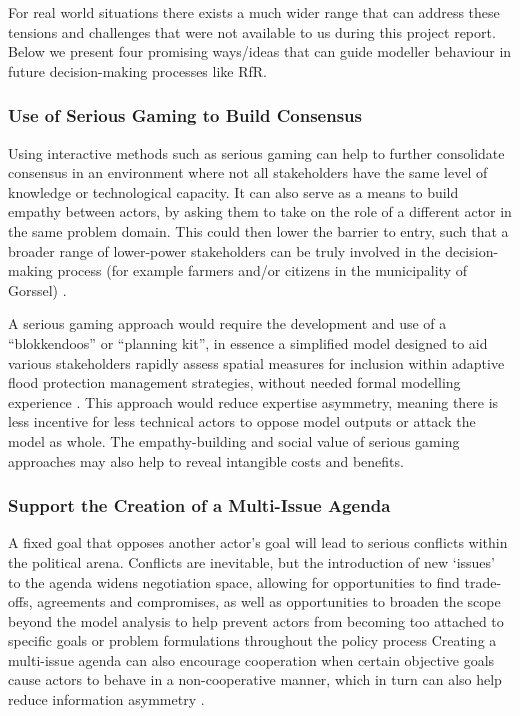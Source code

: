 For real world situations there exists a much wider range that can address these tensions and challenges that were not available to us during this project report. Below we present four promising ways/ideas that can guide modeller behaviour in future decision-making processes like RfR.

\subsubsection{Use of Serious Gaming to Build Consensus}

Using interactive methods such as serious gaming can help to further consolidate consensus in an environment where not all stakeholders have the same level of knowledge or technological capacity. It can also serve as a means to build empathy between actors, by asking them to take on the role of a different actor in the same problem domain. This could then lower the barrier to entry, such that a broader range of lower-power stakeholders can be truly involved in the decision-making process (for example farmers and/or citizens in the municipality of Gorssel) \parencite{savic_serious_2016}.

A serious gaming approach would require the development and use of a “blokkendoos” or “planning kit”, in essence a simplified model designed to aid various stakeholders rapidly assess spatial measures for inclusion within adaptive flood protection management strategies, without needed formal modelling experience \parencite{warren_collaborative_2015}. This approach would reduce expertise asymmetry, meaning there is less incentive for less technical actors to oppose model outputs or attack the model as whole. The empathy-building and social value of serious gaming approaches may also help to reveal intangible costs and benefits. 

\subsubsection{Support the Creation of a Multi-Issue Agenda} 

A fixed goal that opposes another actor’s goal will lead to serious conflicts within the political arena. Conflicts are inevitable, but the introduction of new ‘issues’ to the agenda widens negotiation space, allowing for opportunities to find trade-offs, agreements and compromises, as well as opportunities to broaden the scope beyond the model analysis to help prevent actors from becoming too attached to specific goals or problem formulations throughout the policy process \parencite{hans_de_bruijn_mark_de_bruijne_ernst_ten_heuvelhof_politics_2015} Creating a multi-issue agenda can also encourage cooperation when certain objective goals cause actors to behave in a non-cooperative manner, which in turn can also help reduce information asymmetry \parencite{coehoorn_learning_2004}.

